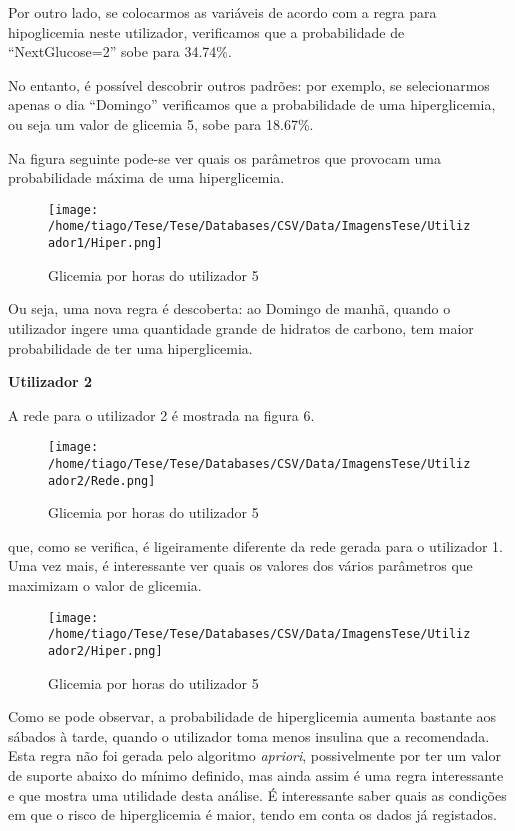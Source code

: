 Por outro lado, se colocarmos as variáveis de acordo com a regra para hipoglicemia neste utilizador, verificamos que a probabilidade de ``Next\textunderscore Glucose=2'' sobe para 34.74\%.

No entanto, é possível descobrir outros padrões: por exemplo, se selecionarmos apenas o dia ``Domingo'' verificamos que a probabilidade de uma hiperglicemia, ou seja um valor de glicemia 5, sobe para 18.67\%. 

Na figura seguinte pode-se ver quais os parâmetros que provocam uma probabilidade máxima de uma hiperglicemia.

\begin{figure}[H]
\centering
\texttt{[image: /home/tiago/Tese/Tese/Databases/CSV/Data/ImagensTese/Utilizador1/Hiper.png]}
\caption{Glicemia por horas do utilizador 5}
\end{figure}
Ou seja, uma nova regra é descoberta: ao Domingo de manhã, quando o utilizador ingere uma quantidade grande de hidratos de carbono, tem maior probabilidade de ter uma hiperglicemia. 

\textbf{Utilizador 2}


A rede para o utilizador 2 é mostrada na figura 6.

\begin{figure}[H]
\centering
\texttt{[image: /home/tiago/Tese/Tese/Databases/CSV/Data/ImagensTese/Utilizador2/Rede.png]}
\caption{Glicemia por horas do utilizador 5}
\end{figure}
que, como se verifica, é ligeiramente diferente da rede gerada para o utilizador 1. Uma vez mais, é interessante ver quais os valores dos vários parâmetros que maximizam o valor de glicemia. 

\begin{figure}[H]
\centering
\texttt{[image: /home/tiago/Tese/Tese/Databases/CSV/Data/ImagensTese/Utilizador2/Hiper.png]}
\caption{Glicemia por horas do utilizador 5}
\end{figure}
Como se pode observar, a probabilidade de hiperglicemia aumenta bastante aos sábados à tarde, quando o utilizador toma menos insulina que a recomendada. Esta regra não foi gerada pelo algoritmo \textit{apriori}, possivelmente por ter um valor de suporte abaixo do mínimo definido, mas ainda assim é uma regra interessante e que mostra uma utilidade desta análise. É interessante saber quais as condições em que o risco de hiperglicemia é maior, tendo em conta os dados já registados. 

